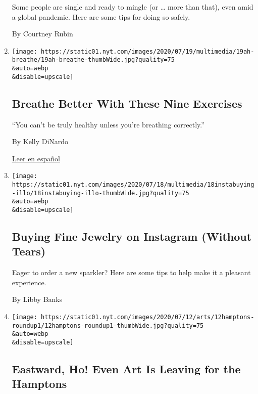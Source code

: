 \begin{enumerate}
  Some people are single and ready to mingle (or \ldots{} more than
  that), even amid a global pandemic. Here are some tips for doing so
  safely.

  By Courtney Rubin
\item
  \href{/2020/07/18/at-home/coronavirus-breathing-exercises.html}{}

  \texttt{[image: https://static01.nyt.com/images/2020/07/19/multimedia/19ah-breathe/19ah-breathe-thumbWide.jpg?quality=75\\\&auto=webp\\\&disable=upscale]}

  \hypertarget{breathe-better-with-these-nine-exercises}{%
  \subsection{Breathe Better With These Nine
  Exercises}\label{breathe-better-with-these-nine-exercises}}

  ``You can't be truly healthy unless you're breathing correctly.''

  By Kelly DiNardo

  \href{https://www.nytimes.com/es/2020/07/27/espanol/respira-mejor-con-estos-nueve-ejercicios.html}{Leer
  en español}
\item
  \href{/2020/07/17/fashion/jewelry-instagram-buying-online.html}{}

  \texttt{[image: https://static01.nyt.com/images/2020/07/18/multimedia/18instabuying-illo/18instabuying-illo-thumbWide.jpg?quality=75\\\&auto=webp\\\&disable=upscale]}

  \hypertarget{buying-fine-jewelry-on-instagram-without-tears}{%
  \subsection{Buying Fine Jewelry on Instagram (Without
  Tears)}\label{buying-fine-jewelry-on-instagram-without-tears}}

  Eager to order a new sparkler? Here are some tips to help make it a
  pleasant experience.

  By Libby Banks
\item
  \href{/2020/07/12/arts/design/eastward-ho-even-art-is-leaving-for-the-hamptons.html}{}

  \texttt{[image: https://static01.nyt.com/images/2020/07/12/arts/12hamptons-roundup1/12hamptons-roundup1-thumbWide.jpg?quality=75\\\&auto=webp\\\&disable=upscale]}

  \hypertarget{eastward-ho-even-art-is-leaving-for-the-hamptons}{%
  \subsection{Eastward, Ho! Even Art Is Leaving for the
  Hamptons}\label{eastward-ho-even-art-is-leaving-for-the-hamptons}}


\end{enumerate}
